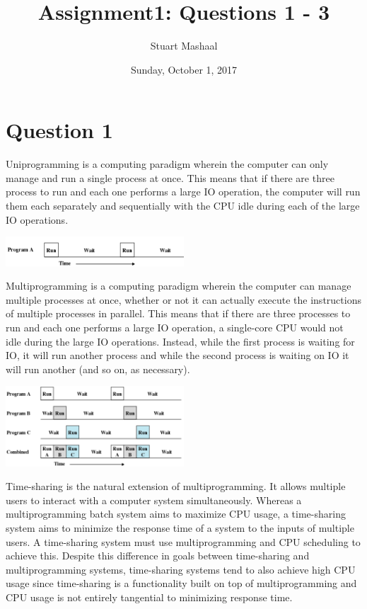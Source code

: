 \documentclass[11pt, letterpaper]{article}
\title{Assignment1: Questions 1 - 3}
\author{Stuart Mashaal}
\date{Sunday, October 1, 2017}
\begin{document}
\maketitle

\section*{Question 1}

Uniprogramming is a computing paradigm wherein the computer can only manage and run a single process at once.  This means that if there are three process to run and each one performs a large IO operation, the computer will run them each separately and sequentially with the CPU idle during each of the large IO operations.

\begin{center}
    \includegraphics[width=0.5\textwidth]{uniprogramming.png}
\end{center}

Multiprogramming is a computing paradigm wherein the computer can manage multiple processes at once, whether or not it can actually execute the instructions of multiple processes in parallel.  This means that if there are three processes to run and each one performs a large IO operation, a single-core CPU would not idle during the large IO operations.  Instead, while the first process is waiting for IO, it will run another process and while the second process is waiting on IO it will run another (and so on, as necessary).

\begin{center}
    \includegraphics[width=0.5\textwidth]{multiprogramming.png}
\end{center}

Time-sharing is the natural extension of multiprogramming. It allows multiple users to interact with a computer system simultaneously.  Whereas a multiprogramming batch system aims to maximize CPU usage, a time-sharing system aims to minimize the response time of a system to the inputs of multiple users.  A time-sharing system must use multiprogramming and CPU scheduling to achieve this.  Despite this difference in goals between time-sharing and multiprogramming systems, time-sharing systems tend to also achieve high CPU usage since time-sharing is a functionality built on top of multiprogramming and CPU usage is not entirely tangential to minimizing response time.
\end{document}
